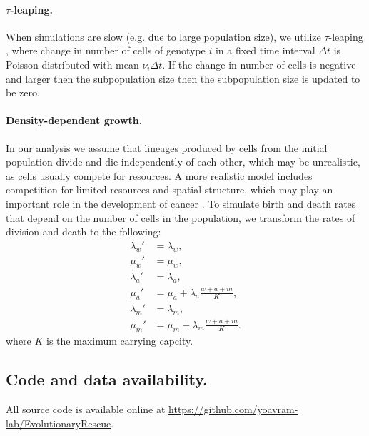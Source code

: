 \documentclass[12pt]{extarticle}
\begin{document}
\paragraph{$\tau$-leaping.}
When simulations are slow (e.g. due to large population size), we utilize $\tau$-leaping \citep{gillespie2001approximate}, where change in number of cells of genotype $i$ in a fixed time interval $\Delta t$ is Poisson distributed with mean $\nu_i\Delta t$.
If the change in number of cells is negative and larger then the subpopulation size then the subpopulation size is updated to be zero.


\paragraph{Density-dependent growth.}

In our analysis we assume that lineages produced by cells from the initial population divide and die independently of each other, which may be unrealistic, as cells usually compete for resources.
A more realistic model includes competition for limited resources and spatial structure, which may play an important role in the development of cancer \citep[e.g.,][]{martens2011spatial}.
To simulate birth and death rates that depend on the number of cells in the population, we transform the rates of division and death to the following:
\begin{align*}
\lambda_w' &= \lambda_w, \\
\mu_w' &= \mu_w,\\
\lambda_a' &= \lambda_a,\\ 
\mu_a' &= \mu_a + \lambda_a\frac{w+a+m}{K},\\
\lambda_m' &= \lambda_m,\\ 
\mu_m' &= \mu_m + \lambda_m\frac{w+a+m}{K}.
\end{align*}
where $K$ is the maximum carrying capcity. %


\subsection*{Code and data availability.} All source code is available online at \url{https://github.com/yoavram-lab/EvolutionaryRescue}.

\end{document}
